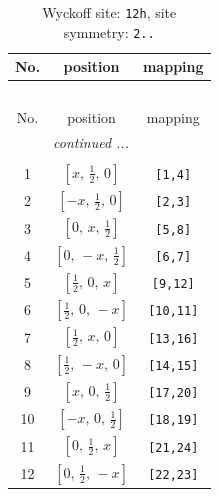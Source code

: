 \documentclass[fleqn,8pt]{jsarticle}
\begin{document}
\begin{longtable}{ccc}
\caption{Wyckoff site: {\tt 12h}, site symmetry: {\tt 2..}}
 \\
 \hline \hline
No. & position & mapping \\ \hline \endfirsthead

\multicolumn{2}{l}{\tablename\ \thetable{}} \\
 \hline \hline
No. & position & mapping \\ \hline \endhead

 \hline \hline
\multicolumn{2}{r}{\footnotesize\it continued ...} \\ \endfoot

 \hline \hline
\multicolumn{2}{r}{} \\ \endlastfoot

1 & $\left[ x,\, \frac{1}{2},\, 0 \right]$ & {\tt [1,4]} \\ \hline
2 & $\left[ - x,\, \frac{1}{2},\, 0 \right]$ & {\tt [2,3]} \\ \hline
3 & $\left[ 0,\, x,\, \frac{1}{2} \right]$ & {\tt [5,8]} \\ \hline
4 & $\left[ 0,\, - x,\, \frac{1}{2} \right]$ & {\tt [6,7]} \\ \hline
5 & $\left[ \frac{1}{2},\, 0,\, x \right]$ & {\tt [9,12]} \\ \hline
6 & $\left[ \frac{1}{2},\, 0,\, - x \right]$ & {\tt [10,11]} \\ \hline
7 & $\left[ \frac{1}{2},\, x,\, 0 \right]$ & {\tt [13,16]} \\ \hline
8 & $\left[ \frac{1}{2},\, - x,\, 0 \right]$ & {\tt [14,15]} \\ \hline
9 & $\left[ x,\, 0,\, \frac{1}{2} \right]$ & {\tt [17,20]} \\ \hline
10 & $\left[ - x,\, 0,\, \frac{1}{2} \right]$ & {\tt [18,19]} \\ \hline
11 & $\left[ 0,\, \frac{1}{2},\, x \right]$ & {\tt [21,24]} \\ \hline
12 & $\left[ 0,\, \frac{1}{2},\, - x \right]$ & {\tt [22,23]} \\
\end{longtable}
\renewcommand{\arraystretch}{1.2}
\end{document}
